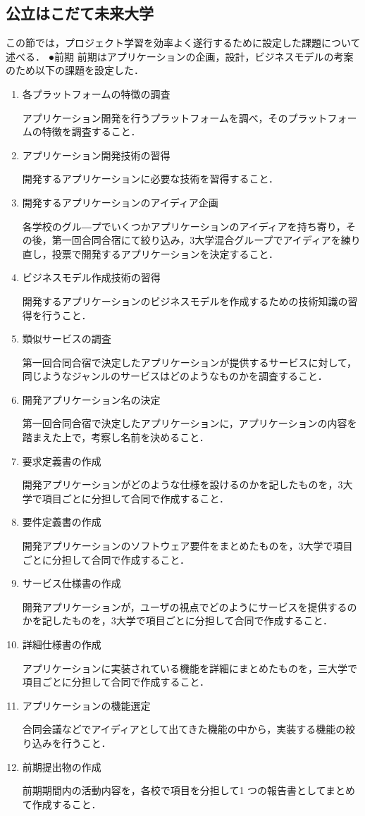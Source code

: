 \subsection{公立はこだて未来大学}
\par この節では，プロジェクト学習を効率よく遂行するために設定した課題について述べる．
●前期
前期はアプリケーションの企画，設計，ビジネスモデルの考案のため以下の課題を設定した．
\begin{enumerate}
\item 各プラットフォームの特徴の調査
\par アプリケーション開発を行うプラットフォームを調べ，そのプラットフォームの特徴を調査すること．
\item アプリケーション開発技術の習得 
\par 開発するアプリケーションに必要な技術を習得すること．
\item 開発するアプリケーションのアイディア企画
\par 各学校のグル―プでいくつかアプリケーションのアイディアを持ち寄り，その後，第一回合同合宿にて絞り込み，3大学混合グループでアイディアを練り直し，投票で開発するアプリケーションを決定すること．
\item ビジネスモデル作成技術の習得
\par 開発するアプリケーションのビジネスモデルを作成するための技術知識の習得を行うこと．
\item 類似サービスの調査
\par 第一回合同合宿で決定したアプリケーションが提供するサービスに対して，同じようなジャンルのサービスはどのようなものかを調査すること．\item 開発アプリケーション名の決定
\par 第一回合同合宿で決定したアプリケーションに，アプリケーションの内容を踏まえた上で，考察し名前を決めること．
\item 要求定義書の作成
\par 開発アプリケーションがどのような仕様を設けるのかを記したものを，3大学で項目ごとに分担して合同で作成すること．
\item 要件定義書の作成
\par 開発アプリケーションのソフトウェア要件をまとめたものを，3大学で項目ごとに分担して合同で作成すること．
\item サービス仕様書の作成
\par 開発アプリケーションが，ユーザの視点でどのようにサービスを提供するのかを記したものを，3大学で項目ごとに分担して合同で作成すること．
\item 詳細仕様書の作成
\par アプリケーションに実装されている機能を詳細にまとめたものを，三大学で項目ごとに分担して合同で作成すること．
\item アプリケーションの機能選定
\par 合同会議などでアイディアとして出てきた機能の中から，実装する機能の絞り込みを行うこと．
\item  前期提出物の作成
\par 前期期間内の活動内容を，各校で項目を分担して1 つの報告書としてまとめて作成すること．
\end{enumerate}

